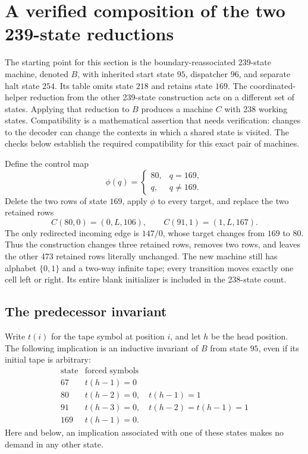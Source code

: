 \section{A verified composition of the two 239-state reductions}

The starting point for this section is the boundary-reassociated 239-state
machine, denoted $B$, with inherited start state $95$, dispatcher $96$, and
separate halt state $254$.  Its table omits state $218$ and retains state
$169$.  The coordinated-helper reduction from the other 239-state
construction acts on a different set of states.  Applying that reduction
to $B$ produces a machine $C$ with 238 working states.  Compatibility is a
mathematical assertion that needs verification: changes to the decoder can
change the contexts in which a shared state is visited.  The checks below
establish the required compatibility for this exact pair of machines.

Define the control map
\[
 \phi(q)=\begin{cases}80,&q=169,\\q,&q\ne169.\end{cases}
\]
Delete the two rows of state $169$, apply $\phi$ to every target, and replace
the two retained rows
\[
 C(80,0)=(0,L,106),\qquad C(91,1)=(1,L,167).
\]
The only redirected incoming edge is $147/0$, whose target changes from
$169$ to $80$.  Thus the construction changes three retained rows, removes
two rows, and leaves the other 473 retained rows literally unchanged.
The new machine still has alphabet $\{0,1\}$ and a two-way infinite tape;
every transition moves exactly one cell left or right.  Its entire blank
initializer is included in the 238-state count.

\subsection{The predecessor invariant}

Write $t(i)$ for the tape symbol at position $i$, and let $h$ be the head
position.  The following implication is an inductive invariant of $B$ from
state $95$, even if its initial tape is arbitrary:
\[
\begin{array}{c|l}
\text{state}&\text{forced symbols}\\\hline
67&t(h-1)=0\\
80&t(h-2)=0,\quad t(h-1)=1\\
91&t(h-3)=0,\quad t(h-2)=t(h-1)=1\\
169&t(h-1)=0.
\end{array}
\]
Here and below, an implication associated with one of these states makes
no demand in any other state.

